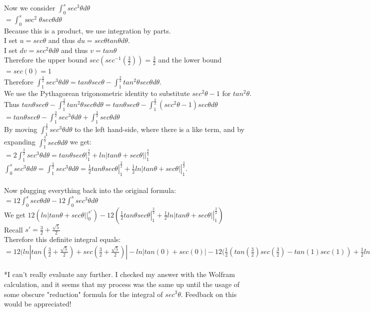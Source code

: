 \documentclass[11pt, oneside]{article}   	%
\begin{document}
\noindent Now we consider $\int_0^s sec^3\theta d\theta$\\
$= \int_0^s \sec^2\theta sec\theta d\theta$\\
Because this is a product, we use integration by parts.\\
I set $u = sec\theta$ and thus $du = sec\theta tan\theta d\theta$.\\
I set $dv = sec^2\theta d\theta$ and thus $v = tan\theta$\\
Therefore the upper bound $sec(sec^{-1}(\frac{3}{2})) = \frac{3}{2}$ and the lower bound $=sec(0) = 1$\\

\noindent Therefore $\int_1^\frac{3}{2} sec^3\theta d\theta = tan\theta sec\theta - \int_1^{\frac{3}{2}} tan^2\theta sec\theta d\theta$.\\
We use the Pythagorean trigonometric identity to substitute $sec^2\theta - 1$ for $tan^2\theta$.\\
Thus $tan\theta sec\theta - \int_1^{\frac{3}{2}} tan^2\theta sec\theta d\theta = tan\theta sec\theta - \int_1^{\frac{3}{2}} (sec^2\theta - 1) sec\theta d\theta$\\
$= tan\theta sec\theta - \int_1^{\frac{3}{2}} sec^3\theta d\theta + \int_1^{\frac{3}{2}}sec \theta d\theta$\\
By moving $\int_1^{\frac{3}{2}} sec^3\theta d\theta$ to the left hand-side, where there is a like term, and by expanding $ \int_1^{\frac{3}{2}} sec \theta d\theta$ we get:\\
$= 2 \int_1^{\frac{3}{2}} sec^3\theta d\theta = \left. tan\theta sec\theta \right|_1^{\frac{3}{2}}+ \left. ln|tan\theta + sec\theta| \right|_1^{\frac{3}{2}}$\\
$\int_0^s sec^3\theta d\theta = \int_1^{\frac{3}{2}} sec^3\theta d\theta = \left. \frac{1}{2} tan\theta sec\theta \right|_1^{\frac{3}{2}}+  \left. \frac{1}{2} ln|tan\theta + sec\theta| \right|_1^{\frac{3}{2}}$.\\~\\

\noindent Now plugging everything back into the original formula: $=12 \int_0^s sec\theta d\theta - 12 \int_0^s sec^3\theta d\theta$\\
We get $12(\left. ln|tan\theta + sec\theta| \right|_0^{s'}) - 12(\left. \frac{1}{2} tan\theta sec\theta \right|_1^{\frac{3}{2}}+  \left. \frac{1}{2} ln|tan\theta + sec\theta| \right|_1^{\frac{3}{2}})$\\
Recall $s' = \frac{3}{2} + \frac{\sqrt{5}}{2}$\\
Therefore this definite integral equals: \\
$= 12(ln|tan(\frac{3}{2} + \frac{\sqrt5}{2}) + sec(\frac{3}{2} + \frac{\sqrt 5}{2})| - ln|tan(0)+sec(0)| - 12(\frac{1}{2}(tan(\frac{3}{2})sec(\frac{3}{2}) - tan(1)sec(1)) + \frac{1}{2}ln| tan(\frac{3}{2}) + sec(\frac{3}{2})| - \frac{1}{2}ln|tan(1)sec(1)|$\\~\\

\noindent**I can't really evaluate any further. I checked my answer with the Wolfram calculation, and it seems that my process was the same up until the usage of some obscure "reduction" formula for the integral of $sec^3\theta$. Feedback on this would be appreciated!
\end{document}
